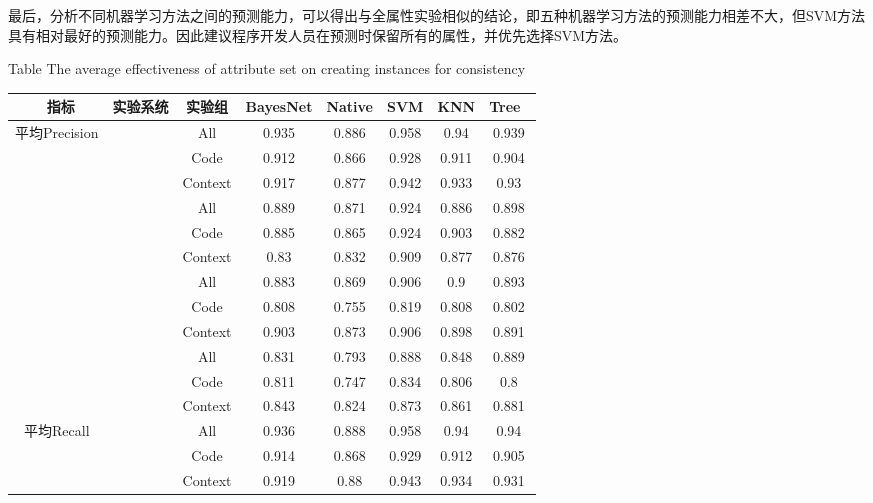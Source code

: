 最后，分析不同机器学习方法之间的预测能力，可以得出与全属性实验相似的结论，即五种机器学习方法的预测能力相差不大，但SVM方法具有相对最好的预测能力。因此建议程序开发人员在预测时保留所有的属性，并优先选择SVM方法。


\begin{table} [htbp]
\renewcommand\arraystretch{0.9} 
{Table$\!$}
{The average effectiveness of attribute set on creating instances for consistency}
\vspace{0.5em}
\centering
\wuhao
\begin{tabular}{cccccccc}
\toprule[1.5pt]
~{指标}&{实验系统}&{实验组}&{BayesNet}&{Native}&{SVM}&{KNN}&{Tree}~\\
\midrule[1pt]
\multirow{12}{*}{平均Precision}
&~\multirow{3}{*}{ArgoUML}
		&All     & 0.935    & 0.886  & 0.958 & 0.94  & 0.939 \\
		& & Code    & 0.912    & 0.866  & 0.928 & 0.911 & 0.904 \\
		&  & Context & 0.917    & 0.877  & 0.942 & 0.933 & 0.93  \\
\cline{2-8}
&~\multirow{3}{*}{jEdit}
            & All     & 0.889    & 0.871  & 0.924 & 0.886 & 0.898 \\
            &       & Code    & 0.885    & 0.865  & 0.924 & 0.903 & 0.882 \\
            &            & Context & 0.83     & 0.832  & 0.909 & 0.877 & 0.876 \\
\cline{2-8}
&~\multirow{3}{*}{jFreeChart}
                    & All     & 0.883    & 0.869  & 0.906 & 0.9   & 0.893 \\
            &  & Code    & 0.808    & 0.755  & 0.819 & 0.808 & 0.802 \\
            &            & Context & 0.903    & 0.873  & 0.906 & 0.898 & 0.891 \\
\cline{2-8}
&~\multirow{3}{*}{Tuxguitar} 
            &      All     & 0.831    & 0.793  & 0.888 & 0.848 & 0.889 \\
            &   & Code    & 0.811    & 0.747  & 0.834 & 0.806 & 0.8   \\
            &            & Context & 0.843    & 0.824  & 0.873 & 0.861 & 0.881 \\
\hline
\multirow{12}{*}{平均Recall}&
~\multirow{3}{*}{ArgoUML}
            &All     & 0.936    & 0.888  & 0.958 & 0.94  & 0.94  \\
            &   & Code    & 0.914    & 0.868  & 0.929 & 0.912 & 0.905 \\
            &            & Context & 0.919    & 0.88   & 0.943 & 0.934 & 0.931 \\

\end{tabular}
\end{table}
